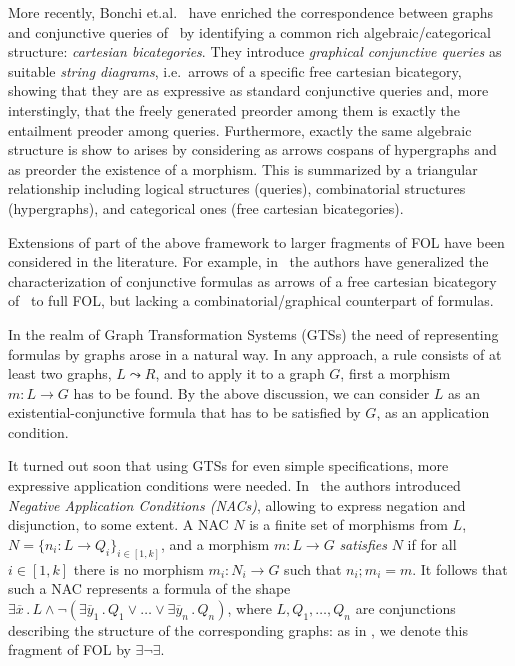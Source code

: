 More recently, Bonchi et.al.~\cite{DBLP:conf/csl/BonchiSS18} have enriched the correspondence between graphs and conjunctive queries of~\cite{DBLP:conf/stoc/ChandraM77} by identifying a common rich algebraic/categorical structure: \emph{cartesian bicategories}. They introduce \emph{graphical conjunctive queries} as suitable \emph{string diagrams}, i.e.~arrows of a specific free cartesian bicategory, showing that they are as expressive as standard conjunctive queries and, more interstingly, that the freely generated preorder among them is exactly the entailment preoder among queries. Furthermore, exactly the same algebraic structure is show to arises by considering as arrows cospans of hypergraphs and as preorder the existence of a morphism. This is summarized by a triangular relationship including logical structures (queries), combinatorial structures (hypergraphs), and categorical ones (free cartesian bicategories).     

Extensions of part of the above framework to larger fragments of FOL have been considered in the literature. For example, in~\cite{DBLP:journals/corr/abs-2404-18795} the authors have generalized the characterization of conjunctive formulas as arrows of a free cartesian bicategory of~\cite{DBLP:conf/csl/BonchiSS18} to full FOL, but lacking a combinatorial/graphical counterpart of formulas. 

In the realm of Graph Transformation Systems  (GTSs)
 the need of representing formulas by graphs arose in a natural way. 
 In any approach, a rule consists of at least two graphs, $L \leadsto R$, and to apply it to a graph $G$, first a morphism $m: L \to G$ has to be found. 
 By the above discussion, we can consider $L$ as an existential-conjunctive formula that has to be satisfied by $G$, as an application condition. 

 It turned out soon that using GTSs for even simple specifications, more expressive application conditions 
 were needed. 
 In~\cite{NegativeAC} the authors introduced \emph{Negative Application Conditions (NACs)}, allowing to express negation and disjunction, to some extent.  A NAC $N$ is  a finite set of morphisms from $L$, $N = \{n_i: L \to Q_i\}_{i\in[1,k]}$, and a morphism $m: L \to G$ \emph{satisfies} $N$ if for all $i\in[1,k]$ there is no morphism $m_i: N_i \to G$ such that $n_i;m_i = m$. 
 It follows that such a NAC represents a formula of the shape $\exists \overline{x}\,.\, L \wedge \neg (\exists \overline{y}_1\,.\, Q_1 \vee \ldots \vee \exists \overline{y}_n\,.\, Q_n)$, where $L, Q_1, \ldots,Q_n$ are conjunctions describing the structure of the corresponding graphs: as in \cite{Rensink-FOL}, we denote this fragment of FOL by $\exists \neg \exists$.

